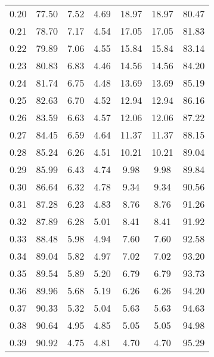 \begin{tabular}{|c|c|c|c|c|c|c|}
      0.20 &     77.50 &      7.52 &       4.69 &   18.97 &      18.97 &         80.47 \\
      0.21 &     78.70 &      7.17 &       4.54 &   17.05 &      17.05 &         81.83 \\
      0.22 &     79.89 &      7.06 &       4.55 &   15.84 &      15.84 &         83.14 \\
      0.23 &     80.83 &      6.83 &       4.46 &   14.56 &      14.56 &         84.20 \\
      0.24 &     81.74 &      6.75 &       4.48 &   13.69 &      13.69 &         85.19 \\
      0.25 &     82.63 &      6.70 &       4.52 &   12.94 &      12.94 &         86.16 \\
      0.26 &     83.59 &      6.63 &       4.57 &   12.06 &      12.06 &         87.22 \\
      0.27 &     84.45 &      6.59 &       4.64 &   11.37 &      11.37 &         88.15 \\
      0.28 &     85.24 &      6.26 &       4.51 &   10.21 &      10.21 &         89.04 \\
      0.29 &     85.99 &      6.43 &       4.74 &    9.98 &       9.98 &         89.84 \\
      0.30 &     86.64 &      6.32 &       4.78 &    9.34 &       9.34 &         90.56 \\
      0.31 &     87.28 &      6.23 &       4.83 &    8.76 &       8.76 &         91.26 \\
      0.32 &     87.89 &      6.28 &       5.01 &    8.41 &       8.41 &         91.92 \\
      0.33 &     88.48 &      5.98 &       4.94 &    7.60 &       7.60 &         92.58 \\
      0.34 &     89.04 &      5.82 &       4.97 &    7.02 &       7.02 &         93.20 \\
      0.35 &     89.54 &      5.89 &       5.20 &    6.79 &       6.79 &         93.73 \\
      0.36 &     89.96 &      5.68 &       5.19 &    6.26 &       6.26 &         94.20 \\
      0.37 &     90.33 &      5.32 &       5.04 &    5.63 &       5.63 &         94.63 \\
      0.38 &     90.64 &      4.95 &       4.85 &    5.05 &       5.05 &         94.98 \\
      0.39 &     90.92 &      4.75 &       4.81 &    4.70 &       4.70 &         95.29 \\

\end{tabular}
